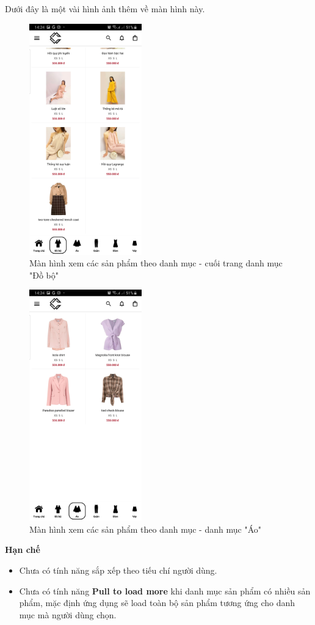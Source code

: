 \documentclass[12pt]{article}
\begin{document}
\newpage
\indent Dưới đây là một vài hình ảnh thêm về màn hình này.
\begin{figure}[H]
    \centering
    \includegraphics[height=10cm]{images/19.png}
    \caption{Màn hình xem các sản phẩm theo danh mục - cuối trang danh mục "Đồ bộ"}
\end{figure}

\begin{figure}[H]
    \centering
    \includegraphics[height=10cm]{images/20.png}
    \caption{Màn hình xem các sản phẩm theo danh mục - danh mục "Áo"}
\end{figure}

\indent \textbf{Hạn chế}
\begin{itemize}
    \item Chưa có tính năng sắp xếp theo tiếu chí người dùng.
    \item Chưa có tính năng \textbf{Pull to load more} khi danh mục sản phẩm có nhiều sản phẩm, mặc định ứng dụng sẽ load toàn bộ sản phẩm tương ứng cho danh mục mà người dùng chọn.
\end{itemize}
\end{document}
